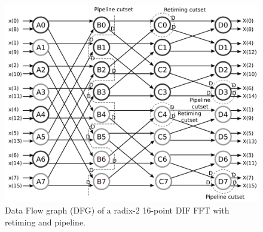 \documentclass[journal,comsoc]{IEEEtran}
\begin{document}
\begin{figure} 
\centering
\includegraphics[width=\linewidth]{Diagramas/16points_dfg_ret.png}
\caption{Data Flow graph (DFG) of a radix-2 16-point DIF FFT with retiming and pipeline.}
\label{fig:dfg_16_ret}
\end{figure}
\end{document}
